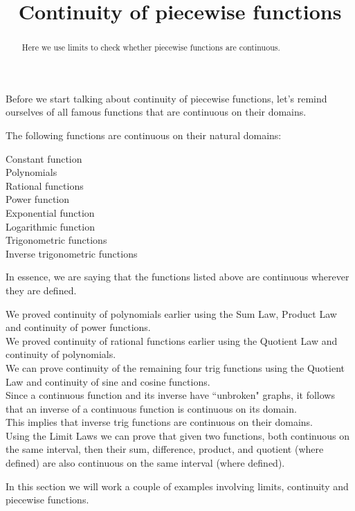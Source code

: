 \documentclass{ximera}
\title[Dig-In:]{Continuity of piecewise functions}
\begin{document}
\begin{abstract}
Here we use limits to check whether piecewise functions are continuous.
\end{abstract}
\maketitle
Before we start talking about continuity of piecewise functions, let's remind ourselves of all famous functions that are continuous on their domains.
\begin{theorem}\label{theorem:continuity}
The following functions are continuous on their natural domains:
\begin{description}
\item[Constant function]
\item[Polynomials]
\item[Rational functions]
\item[Power function]
\item[Exponential function] 
\item[Logarithmic function] 
\item[Trigonometric functions]  
\item[Inverse trigonometric functions]     
\end{description}
In essence, we are saying that the functions listed above are
continuous wherever they are defined.

We  proved continuity of polynomials earlier using the Sum Law, Product Law and continuity of power functions.\\
We  proved continuity of rational functions earlier using the Quotient Law and  continuity of polynomials.\\
We can  prove continuity of the remaining four trig functions using the Quotient Law and continuity of sine and cosine functions.\\

Since a continuous function and its inverse have ``unbroken" graphs, it follows that an inverse of a continuous function is continuous on its domain.\\
This implies that inverse trig functions are continuous on their domains. \\


Using the Limit Laws we can prove that given two functions, both continuous on the same  interval, then their sum, difference, product, and quotient (where defined) are also continuous on the same interval (where defined). 




\end{theorem}
In this section we will work a couple of examples involving limits,
continuity and piecewise functions.
\end{document}
